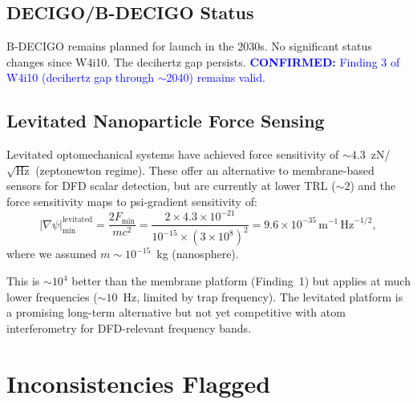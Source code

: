 \documentclass[11pt]{article}
\theoremstyle{definition}
\theoremstyle{remark}
\newcommand{\ee}[1]{\times10^{#1}}
\newcommand{\sqrtHz}{\,\mathrm{Hz}^{-1/2}}
\newcommand{\confirmed}[1]{\textcolor{blue}{\textbf{CONFIRMED:} #1}}
\begin{document}
\subsection{DECIGO/B-DECIGO Status}

B-DECIGO remains planned for launch in the 2030s. No significant
status changes since W4i10. The decihertz gap persists.
\confirmed{Finding 3 of W4i10 (decihertz gap through $\sim$2040)
remains valid.}

\subsection{Levitated Nanoparticle Force Sensing}

Levitated optomechanical systems have achieved force sensitivity
of $\sim 4.3$~zN/$\sqrt{\mathrm{Hz}}$ (zeptonewton regime).
These offer an alternative to membrane-based sensors for DFD
scalar detection, but are currently at lower TRL ($\sim$2) and
the force sensitivity maps to psi-gradient sensitivity of:
\begin{equation}
|\nabla\psi|_{\min}^{\mathrm{levitated}} = \frac{2 F_{\min}}{m c^2}
= \frac{2 \times 4.3\ee{-21}}{10^{-15} \times (3\ee{8})^2}
= 9.6\ee{-35}\,\mathrm{m}^{-1}\sqrtHz,
\end{equation}
where we assumed $m \sim 10^{-15}$~kg (nanosphere).

This is $\sim 10^4$ better than the membrane platform (Finding~1)
but applies at much lower frequencies ($\sim 10$~Hz, limited by
trap frequency). The levitated platform is a promising long-term
alternative but not yet competitive with atom interferometry for
DFD-relevant frequency bands.

\section{Inconsistencies Flagged}
\label{sec:inconsistencies}
\end{document}
